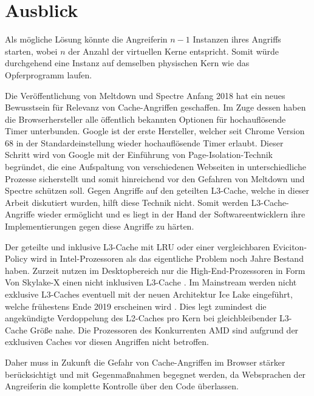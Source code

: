 \section{Ausblick}

Als mögliche Lösung könnte die Angreiferin $n-1$ Instanzen ihres Angriffs starten, wobei $n$ der Anzahl der virtuellen Kerne entspricht.
Somit würde durchgehend eine Instanz auf demselben physischen Kern wie das Opferprogramm laufen.

Die Veröffentlichung von Meltdown und Spectre Anfang 2018 hat ein neues Bewusstsein für Relevanz von Cache-Angriffen geschaffen.
Im Zuge dessen haben die Browserhersteller alle öffentlich bekannten Optionen für hochauflösende Timer unterbunden.
Google ist der erste Hersteller, welcher seit Chrome Version 68 in der Standardeinstellung wieder hochauflösende Timer erlaubt.
Dieser Schritt wird von Google mit der Einführung von Page-Isolation-Technik \cite{ChromeSiteIsolation} begründet, die eine Aufspaltung von verschiedenen Webseiten in unterschiedliche Prozesse sicherstellt und somit hinreichend vor den Gefahren von Meltdown und Spectre schützen soll.
Gegen Angriffe auf den geteilten L3-Cache, welche in dieser Arbeit diskutiert wurden, hilft diese Technik nicht.
Somit werden L3-Cache-Angriffe wieder ermöglicht und es liegt in der Hand der Softwareentwicklern ihre Implementierungen gegen diese Angriffe zu härten.

Der geteilte und inklusive L3-Cache mit LRU oder einer vergleichbaren Eviciton-Policy wird in Intel-Prozessoren als das eigentliche Problem noch Jahre Bestand haben.
Zurzeit nutzen im Desktopbereich nur die High-End-Prozessoren in Form Von Skylake-X einen nicht inklusiven L3-Cache \cite{SkylakeXL3Cache}.
Im Mainstream werden nicht exklusive L3-Caches eventuell mit der neuen Architektur Ice Lake eingeführt, welche frühestens Ende 2019 erscheinen wird \cite{IceLakeReleaseDate}.
Dies legt zumindest die angekündigte Verdoppelung des L2-Caches pro Kern bei gleichbleibender L3-Cache Größe nahe.
Die Prozessoren des Konkurrenten AMD sind aufgrund der exklusiven Caches \cite{CacheRyzen} vor diesen Angriffen nicht betroffen.

Daher muss in Zukunft die Gefahr von Cache-Angriffen im Browser stärker berücksichtigt und mit Gegenmaßnahmen begegnet werden, da Websprachen der Angreiferin die komplette Kontrolle über den Code überlassen.








